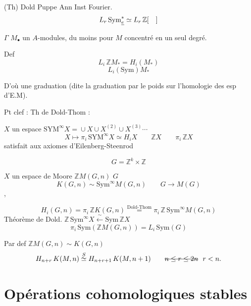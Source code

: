 \documentclass[11pt,a4paper]{article}
\begin{document}
(Th) Dold Puppe Ann Inst Fourier.
\[
  L_r\,\mathrm{Sym}^{\ast}_{\uncertain{e}} \simeq L_r\,\mathbb{Z}[\quad]
\]

$\Gamma$ \qquad $M_{\bullet}$ un  $A$-modules, du moins pour $M$ concentré en un seul degré.


Def
\[
  L_i\,\mathbb{Z}M_{\ast} = H_i(M_{\ast})
\]
\[
  L_i(\mathrm{Sym})M_{\ast}
\]

D'où une graduation (dite la graduation par le poids sur l'homologie des esp d'E.M).

Pt clef : Th de Dold-Thom :

$X$ un espace \qquad $\mathrm{SYM}^{\infty}X = {} \cup X \cup X^{(2)} \cup X^{(3)} \cdots$
\[
  X \mapsto \pi_i\,\mathrm{SYM}^{\infty}X \simeq H_iX
  \qquad \mathbb{Z}X \qquad \pi_i\,\mathbb{Z}X
\]
satisfait aux axiomes d'Eilenberg-Steenrod

\[
  G = \mathbb{Z}^{k} \times \mathbb{Z}
\]

$X$ un espace de Moore $\mathbb{Z}M(G,n)$ \qquad $G$
\[
  K(G,n) \sim \mathrm{Sym}^{\infty}M(G,n) \qquad G \to M(G)
\]
, 

\[
  H_i(G,n) = \pi_i\,\mathbb{Z}K(G,n) \overset{\text{Dold-Thom}}{=}
  \pi_i\,\mathbb{Z}\,\mathrm{Sym}^{\infty}M(G,n)
\]
Théorème de Dold. \quad $\mathbb{Z}\,\mathrm{Sym}^{\infty}X \xleftarrow{\ \sim\ } \mathrm{Sym}\,\mathbb{Z}X$
\[
  \pi_i\,\mathrm{Sym}(\mathbb{Z}M(G,n)) = L_i\,\mathrm{Sym}(G)
\]

 Par def \quad $\mathbb{Z}M(G,n) \sim K(G,n)$
\[
  H_{n+r}\,K(M,n) \overset{S}{\simeq} H_{n+r+1}\,K(M,n+1)
  \qquad \text{\struck{$n \leq r \leq 2n$}}\ \ r < n.
\]

\section{Opérations cohomologiques stables}
\end{document}
